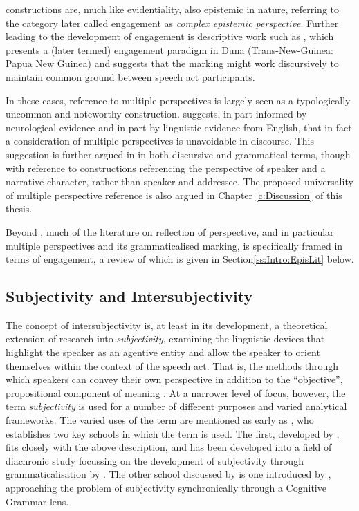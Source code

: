 constructions are, much like evidentiality, also epistemic in nature, referring to the category later called engagement as \textit{complex epistemic perspective}. Further leading to the development of engagement is descriptive work such as , which presents a (later termed) engagement paradigm in Duna (Trans-New-Guinea: Papua New Guinea) and suggests that the marking might work discursively to maintain common ground between speech act participants.

In these cases, reference to multiple perspectives is largely seen as a typologically uncommon and noteworthy construction.  suggests, in part informed by neurological evidence and in part by linguistic evidence from English, that in fact a consideration of multiple perspectives is unavoidable in discourse. This suggestion is further argued in  in both discursive and grammatical terms, though with reference to constructions referencing the perspective of speaker and a narrative character, rather than speaker and addressee. The proposed universality of multiple perspective reference is also argued in Chapter \ref{c:Discussion} of this thesis. 

Beyond , much of the literature on reflection of perspective, and in particular multiple perspectives and its grammaticalised marking, is specifically framed in terms of engagement, a review of which is given in Section\ref{ss:Intro:EpisLit} below. 

\subsection{Subjectivity and Intersubjectivity}

The concept of intersubjectivity is, at least in its development, a theoretical extension of research into \textit{subjectivity}, examining the linguistic devices that highlight the speaker as an agentive entity and allow the speaker to orient themselves within the context of the speech act. That is, the methods through which speakers can convey their own perspective in addition to the ``objective'', propositional component of meaning \cite{Finegan1995}. At a narrower level of focus, however, the term \textit{subjectivity} is used for a number of different purposes and varied analytical frameworks. The varied uses of the term are mentioned as early as , who establishes two key schools in which the term is used. The first, developed by , fits closely with the above description, and has been developed into a field of diachronic study focussing on the development of subjectivity through grammaticalisation by . The other school discussed by  is one introduced by , approaching the problem of subjectivity synchronically through a Cognitive Grammar lens.
    
